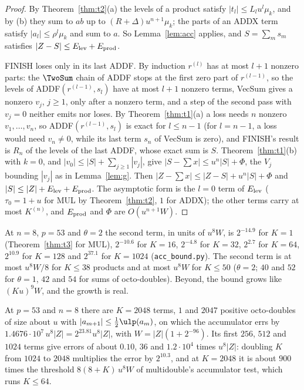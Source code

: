 \begin{proof}
By Theorem~\ref{thm:t2}(a) the levels of a product satisfy $|t_l| \le L_lu^l\mu_k$, and by (b) they sum to $a b$
up to $(R+\Delta)u^{n+1}\mu_k$; the parts of an ADDX term satisfy $|a_l| \le \rho^l\mu_k$ and sum to $a$. So
Lemma~\ref{lem:acc} applies, and $S = \sum_m s_m$ satisfies $|Z - S| \le E_{\rm lev} + E_{\rm prod}$.

FINISH loses only in its last ADDF. By induction $r^{(l)}$ has at most $l+1$ nonzero parts: the $\TwoSum$ chain of
ADDF stops at the first zero part of $r^{(l-1)}$, so the levels of ADDF$(r^{(l-1)}, s_l)$ have at most $l+1$ nonzero
terms, VecSum gives a nonzero $v_j$, $j \ge 1$, only after a nonzero term, and a step of the second pass with $v_j = 0$
neither emits nor loses. By Theorem~\ref{thm:t1}(a) a loss needs $n$ nonzero $v_1, \dots, v_n$, so ADDF$(r^{(l-1)},
s_l)$ is exact for $l \le n-1$ (for $l = n-1$, a loss would need $v_n \ne 0$, while its last term $s_n$ of VecSum is
zero), and FINISH's result is $R_n$ of the levels of the last ADDF, whose exact sum is $S$. Theorem~\ref{thm:t1}(b) with
$k = 0$, and $|v_0| \le |S| + \sum_{j \ge 1}|v_j|$, give $|S - \sum x| \le u^n|S| + \Phi$, the $V_j$ bounding
$|v_j|$ as in Lemma~\ref{lem:g}. Then $|Z - \sum x| \le |Z - S| + u^n|S| + \Phi$ and $|S| \le |Z| + E_{\rm lev} +
E_{\rm prod}$. The asymptotic form is the $l = 0$ term of $E_{\rm lev}$ ($\tau_0 = 1 + u$ for MUL by
Theorem~\ref{thm:t2}, $1$ for ADDX); the other terms carry at most $K^{(n)}$, and $E_{\rm prod}$ and $\Phi$ are $O(u^{n+1}W)$.
\end{proof}

At $n = 8$, $p = 53$ and $\theta = 2$ the second term, in units of $u^8W$, is $2^{-14.9}$ for $K = 1$ (Theorem~\ref{thm:t3}
for MUL), $2^{-10.6}$ for $K = 16$, $2^{-4.8}$ for $K = 32$, $2^{2.7}$ for $K = 64$, $2^{10.9}$ for $K = 128$ and $2^{37.1}$
for $K = 1024$ (\texttt{acc\_bound.py}). The second term is at most $u^8W/8$ for $K \le 38$ products and at most $u^8W$
for $K \le 50$ ($\theta = 2$; $40$ and $52$ for $\theta = 1$, $42$ and $54$ for sums of octo-doubles). Beyond, the bound
grows like $(Ku)^{9}W$, and the growth is real.

\begin{proposition}\label{prop:acc-low}
At $p = 53$ and $n = 8$ there are $K = 2048$ terms, $1$ and $2047$ positive octo-doubles of size about $u$ with
$|a_{m+1}| \le \frac12\ulp(a_m)$, on which the accumulator errs by $1.4676 \cdot 10^7\,u^8|Z| = 2^{23.81}u^8|Z|$, with
$W = |Z|(1 + 2^{-96})$. Its first $256$, $512$ and $1024$ terms give errors of about $0.10$, $36$ and $1.2 \cdot 10^4$
times $u^8|Z|$: doubling $K$ from $1024$ to $2048$ multiplies the error by $2^{10.3}$, and at $K = 2048$ it is
about $900$ times the threshold $8(8 + K)\,u^8W$ of multidouble's accumulator test, which runs $K \le 64$.
\end{proposition}

